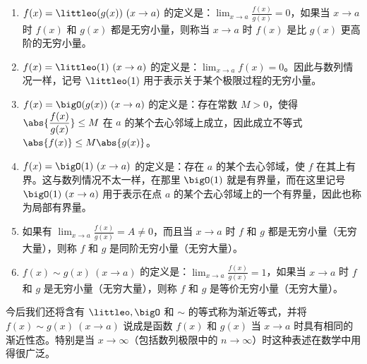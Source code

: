 \begin{enumerate}
  \item $f(x)=\littleo(g(x))\ (x\to a)$ 的定义是：$\displaystyle\lim_{x\to a}\frac{f(x)}{g(x)}=0$，如果当 $x\to a$ 时 $f(x)$ 和 $g(x)$ 都是无穷小量，则称当 $x\to a$ 时 $f(x)$ 是比 $g(x)$ 更高阶的无穷小量。
  \item $f(x)=\littleo(1)\ (x\to a)$ 的定义是：$\displaystyle\lim_{x\to a}f(x)=0$。因此与数列情况一样，记号 $\littleo(1)$ 用于表示关于某个极限过程的无穷小量。
  \item $f(x)=\bigO(g(x))\ (x\to a)$ 的定义是：存在常数 $M>0$，使得 $\displaystyle\abs{\frac{f(x)}{g(x)}}\leq M$ 在 $a$ 的某个去心邻域上成立，因此成立不等式 $\abs{f(x)}\leq M\abs{g(x)}$。
  \item $f(x)=\bigO(1)\ (x\to a)$ 的定义是：存在 $a$ 的某个去心邻域，使 $f$ 在其上有界。这与数列情况不太一样，在那里 $\bigO(1)$ 就是有界量，而在这里记号 $\bigO(1)\ (x\to a)$ 用于表示在点 $a$ 的某个去心邻域上的一个有界量，因此也称为局部有界量。
  \item 如果有 $\displaystyle\lim_{x\to a}\frac{f(x)}{g(x)}=A\ne0$，而且当 $x\to a$ 时 $f$ 和 $g$ 都是无穷小量（无穷大量），则称 $f$ 和 $g$ 是同阶无穷小量（无穷大量）。
  \item $f(x)\sim g(x)\ (x\to a)$ 的定义是：$\displaystyle\lim_{x\to a}\frac{f(x)}{g(x)}=1$，如果当 $x\to a$ 时 $f$ 和 $g$ 是无穷小量（无穷大量），则称 $f$ 和 $g$ 是等价无穷小量（无穷大量）。
\end{enumerate}

今后我们还将含有 $\littleo,\bigO$ 和 $\sim$ 的等式称为渐近等式，并将 $f(x)\sim g(x)\ (x\to a)$ 说成是函数 $f(x)$ 和 $g(x)$ 当 $x\to a$ 时具有相同的渐近性态。特别是当 $x\to\infty$（包括数列极限中的 $n\to\infty$）时这种表述在数学中用得很广泛。

